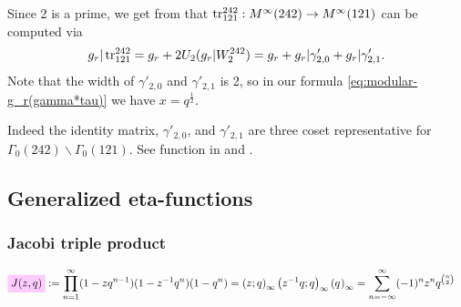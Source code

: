 \documentclass{article}
\begin{document}
Since 2 is a prime, we get from
\cite{Kohnen_WeierstrassPointsAtInfinity_2004} that
$\operatorname{tr}_{121}^{242}: M^\infty(242) \to M^\infty(121)$ can be computed via
\begin{gather*}
  g_r|\operatorname{tr}_{121}^{242}
  = g_r + 2 U_2(g_r|W_2^{242})
  = g_r + g_r|\gamma'_{2,0} + g_r|\gamma'_{2,1}.
\end{gather*}
Note that the width of $\gamma'_{2,0}$ and $\gamma'_{2,1}$ is 2, so in
our formula \eqref{eq:modular-g_r(gamma*tau)} we have
$x=q^{\frac{1}{2}}$.

Indeed the identity matrix, $\gamma'_{2,0}$, and $\gamma'_{2,1}$ are
three coset representative for
$\Gamma_0(242) \backslash \Gamma_0(121)$.
%
See function  in
 and \cite[Lemma~2.44]{Radu_PhD_2010}.































\subsection{Generalized eta-functions}


\subsubsection{Jacobi triple product}

\begin{Definition}
  \label{def:Jacobi-triple-product}
\begin{align}
  \defineNotation[J-z-q]{\jacobiFunction{z}{q}}
  &:=
    \prod_{n=1}^\infty (1-z q^{n-1}) (1-z^{-1}q^n) (1-q^n)
    =
    \qPochhammer{z}{q} \qPochhammer{z^{-1}q}{q} \eulerFunction{}
    =
    \sum_{n=-\infty}^\infty (-1)^n z^n q^{\binom{n}{2}}
\end{align}
\end{Definition}
\end{document}
